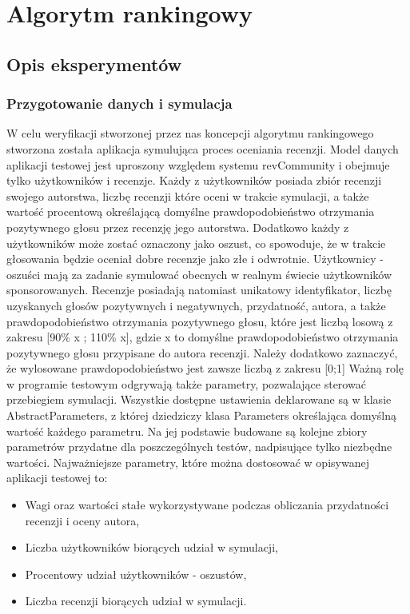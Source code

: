 \chapter{Algorytm rankingowy}

\section{Opis eksperymentów}

\subsection{Przygotowanie danych i symulacja}

W celu weryfikacji stworzonej przez nas koncepcji algorytmu rankingowego stworzona została aplikacja symulująca proces oceniania recenzji. Model danych aplikacji testowej jest uproszony względem systemu revCommunity i obejmuje tylko użytkowników i recenzje. 
Każdy z użytkowników posiada zbiór recenzji swojego autorstwa, liczbę recenzji które oceni w trakcie symulacji, a także wartość procentową określającą  domyślne prawdopodobieństwo otrzymania pozytywnego głosu przez recenzję jego autorstwa. Dodatkowo każdy z użytkowników może zostać oznaczony jako oszust, co spowoduje, że w trakcie głosowania będzie oceniał dobre recenzje jako złe i odwrotnie. Użytkownicy - oszuści mają za zadanie symulować obecnych w realnym świecie użytkowników sponsorowanych.
Recenzje posiadają natomiast unikatowy identyfikator, liczbę uzyskanych głosów pozytywnych i negatywnych, przydatność, autora, a także prawdopodobieństwo otrzymania pozytywnego głosu, które jest liczbą losową z zakresu [90\% x ; 110\% x], gdzie x to domyślne prawdopodobieństwo otrzymania pozytywnego głosu przypisane do autora recenzji. Należy dodatkowo zaznaczyć, że wylosowane prawdopodobieństwo jest zawsze liczbą z zakresu [0;1]
Ważną rolę w programie testowym odgrywają także parametry, pozwalające sterować przebiegiem symulacji. Wszystkie dostępne ustawienia deklarowane są w klasie AbstractParameters, z której dziedziczy klasa Parameters określająca domyślną wartość każdego parametru. Na jej podstawie budowane są kolejne zbiory parametrów przydatne dla poszczególnych testów, nadpisujące tylko niezbędne wartości. Najważniejsze parametry, które można dostosować w opisywanej aplikacji testowej to:

\begin{itemize}
\item Wagi oraz wartości stałe wykorzystywane podczas obliczania przydatności recenzji i oceny autora,
\item Liczba użytkowników biorących udział w symulacji,
\item Procentowy udział użytkowników - oszustów,
\item Liczba recenzji biorących udział w symulacji.
\end{itemize}


